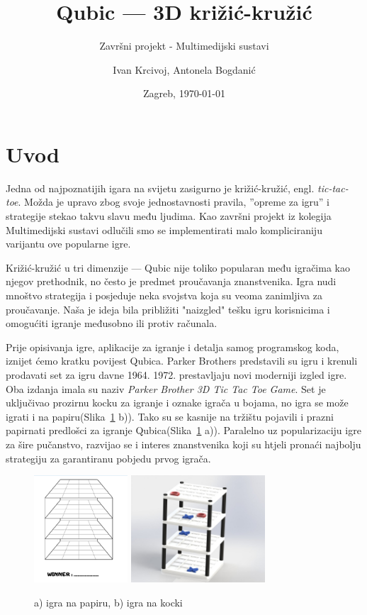 \documentclass[12pt]{scrartcl}
\begin{document}
\title{Qubic --- 3D križić-kružić}
\subtitle{Završni projekt - Multimedijski sustavi}
\author{Ivan Krcivoj, Antonela Bogdanić}
\date{Zagreb, \today}
\maketitle


\newpage

\tableofcontents

\newpage

\section{Uvod}
Jedna od najpoznatijih igara na svijetu zasigurno je križić-kružić, engl. \textit{tic-tac-toe}. Možda je upravo zbog svoje jednostavnosti pravila,
”opreme za igru” i strategije stekao takvu slavu među ljudima. Kao završni projekt iz kolegija Multimedijski sustavi odlučili smo se implementirati malo kompliciraniju varijantu ove popularne igre. 

Križić-kružić u tri dimenzije --- Qubic nije toliko popularan među igračima kao njegov prethodnik, no često je predmet proučavanja znanstvenika. Igra nudi mnoštvo strategija i posjeduje neka svojstva koja su veoma zanimljiva za proučavanje. Naša je ideja bila približiti "naizgled" tešku igru korisnicima i omogućiti igranje međusobno ili protiv računala.

Prije opisivanja igre, aplikacije za igranje i detalja samog programskog koda, iznijet ćemo kratku povijest Qubica. Parker Brothers predstavili su igru i krenuli prodavati set za igru davne 1964. 1972. prestavljaju novi moderniji izgled igre. Oba izdanja imala su naziv \textit{Parker Brother 3D Tic Tac Toe Game}. Set je uključivao prozirnu kocku za igranje i oznake igrača u bojama, no igra se može igrati i na papiru(Slika~\ref{fig:set} b)). Tako su se kasnije na tržištu pojavili i prazni papirnati predlošci za igranje Qubica(Slika~\ref{fig:set} a)). Paralelno uz popularizaciju igre za šire pučanstvo, razvijao se i interes znanstvenika koji su htjeli pronaći najbolju strategiju za garantiranu pobjedu prvog igrača. 


\begin{figure}[h]
	\centering
	\includegraphics[height=40mm]{slika1a}
	\includegraphics[height = 40mm]{slika1b}
	\caption{a) igra na papiru, b) igra na kocki}
	\label{fig:set}
\end{figure}
\end{document}
